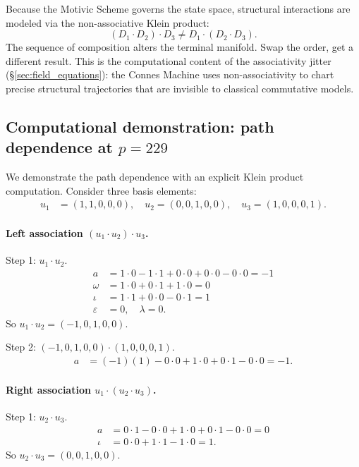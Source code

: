 Because the Motivic Scheme governs the state space, structural interactions are modeled via the non-associative Klein product:
\[
(D_1 \cdot D_2) \cdot D_3 \neq D_1 \cdot (D_2 \cdot D_3).
\]
The sequence of composition alters the terminal manifold. Swap the order, get a different result. This is the computational content of the associativity jitter (\S\ref{sec:field_equations}): the Connes Machine uses non-associativity to chart precise structural trajectories that are invisible to classical commutative models.

\subsection{Computational demonstration: path dependence
at $p = 229$}

We demonstrate the path dependence with an explicit Klein product
computation. Consider three basis elements:
\begin{align}
u_1 &= (1, 1, 0, 0, 0), \quad
u_2 = (0, 0, 1, 0, 0), \quad
u_3 = (1, 0, 0, 0, 1).
\end{align}

\paragraph{Left association $(u_1 \cdot u_2) \cdot u_3$.}

Step 1: $u_1 \cdot u_2$.
\begin{align}
a &= 1 \cdot 0 - 1 \cdot 1 + 0 \cdot 0 + 0 \cdot 0 - 0 \cdot 0 = -1 \\
\omega &= 1 \cdot 0 + 0 \cdot 1 + 1 \cdot 0 = 0 \\
\iota &= 1 \cdot 1 + 0 \cdot 0 - 0 \cdot 1 = 1 \\
\varepsilon &= 0, \quad \lambda = 0.
\end{align}
So $u_1 \cdot u_2 = (-1, 0, 1, 0, 0)$.

Step 2: $(-1, 0, 1, 0, 0) \cdot (1, 0, 0, 0, 1)$.
\begin{align}
a &= (-1)(1) - 0 \cdot 0 + 1 \cdot 0 + 0 \cdot 1 - 0 \cdot 0 = -1.
\end{align}

\paragraph{Right association $u_1 \cdot (u_2 \cdot u_3)$.}

Step 1: $u_2 \cdot u_3$.
\begin{align}
a &= 0 \cdot 1 - 0 \cdot 0 + 1 \cdot 0 + 0 \cdot 1 - 0 \cdot 0 = 0 \\
\iota &= 0 \cdot 0 + 1 \cdot 1 - 1 \cdot 0 = 1.
\end{align}
So $u_2 \cdot u_3 = (0, 0, 1, 0, 0)$.

